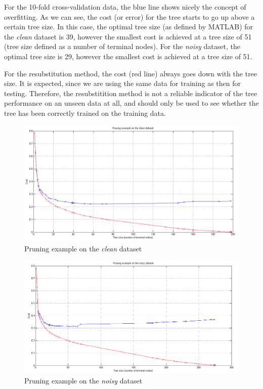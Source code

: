 \documentclass[a4paper]{article}
\begin{document}
For the 10-fold cross-validation data, the blue line shows nicely the concept of overfitting. As we can see, the cost (or error) for the tree starts to go up above a certain tree size. In this case, the optimal tree size (as defined by MATLAB) for the \emph{clean} dataset is 39, however the smallest cost is achieved at a tree size of 51 (tree size defined as a number of terminal nodes). For the \emph{noisy} dataset, the optimal tree size is 29, however the smallest cost is achieved at a tree size of 51.\medskip

For the resubstitution method, the cost (red line) always goes down with the tree size. It is expected, since we are using the same data for training as then for testing. Therefore, the resubstitition method is not a reliable indicator of the tree performance on an unseen data at all, and should only be used to see whether the tree has been correctly trained on the training data.

\begin{figure}[H]
\center
\includegraphics[width=1\columnwidth]{pruneClean} %
\caption{Pruning example on the \emph{clean} dataset}
\label{pruneClean}
\end{figure}

\begin{figure}[H]
\center
\includegraphics[width=1\columnwidth]{pruneNoisy} %
\caption{Pruning example on the \emph{noisy} dataset}
\label{pruneNoisy}
\end{figure}
\end{document}

